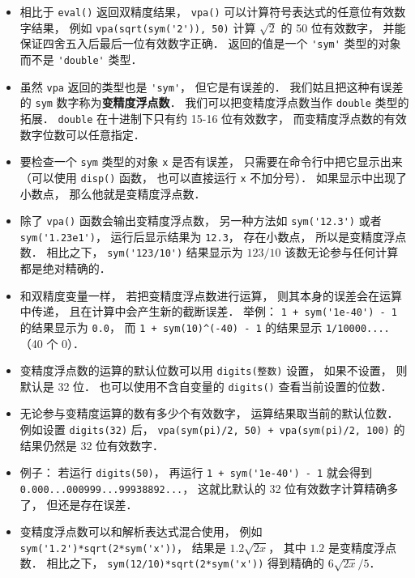 \begin{itemize}
\item 相比于 \verb|eval()| 返回双精度结果， \verb|vpa()| 可以计算符号表达式的任意位有效数字结果， 例如 \verb|vpa(sqrt(sym('2')), 50)| 计算 $\sqrt{2}$ 的 50 位有效数字， 并能保证四舍五入后最后一位有效数字正确． 返回的值是一个 \verb|'sym'| 类型的对象而不是 \verb|'double'| 类型．

\item 虽然 \verb|vpa| 返回的类型也是 \verb|'sym'|， 但它是有误差的． 我们姑且把这种有误差的 \verb|sym| 数字称为\textbf{变精度浮点数}． 我们可以把变精度浮点数当作 \verb|double| 类型的拓展． \verb|double| 在十进制下只有约 15-16 位有效数字， 而变精度浮点数的有效数字位数可以任意指定．

\item 要检查一个 \verb|sym| 类型的对象 \verb|x| 是否有误差， 只需要在命令行中把它显示出来（可以使用 \verb|disp()| 函数， 也可以直接运行 \verb|x| 不加分号）． 如果显示中出现了小数点， 那么他就是变精度浮点数．

\item 除了 \verb|vpa()| 函数会输出变精度浮点数， 另一种方法如 \verb|sym('12.3')| 或者 \verb|sym('1.23e1')|， 运行后显示结果为 \verb|12.3|， 存在小数点， 所以是变精度浮点数． 相比之下， \verb|sym('123/10')| 结果显示为 $123/10$ 该数无论参与任何计算都是绝对精确的．

\item 和双精度变量一样， 若把变精度浮点数进行运算， 则其本身的误差会在运算中传递， 且在计算中会产生新的截断误差． 举例： \verb|1 + sym('1e-40') - 1| 的结果显示为 \verb|0.0|， 而 \verb|1 + sym(10)^(-40) - 1| 的结果显示 \verb|1/10000....|（40 个 0）．

\item 变精度浮点数的运算的默认位数可以用 \verb|digits(整数)| 设置， 如果不设置， 则默认是 32 位． 也可以使用不含自变量的 \verb|digits()| 查看当前设置的位数．

\item 无论参与变精度运算的数有多少个有效数字， 运算结果取当前的默认位数． 例如设置 \verb|digits(32)| 后， \verb|vpa(sym(pi)/2, 50) + vpa(sym(pi)/2, 100)| 的结果仍然是 32 位有效数字．

\item 例子： 若运行 \verb|digits(50)|， 再运行 \verb|1 + sym('1e-40') - 1| 就会得到 \verb|0.000...000999...99938892...|， 这就比默认的 32 位有效数字计算精确多了， 但还是存在误差．

\item 变精度浮点数可以和解析表达式混合使用， 例如 \verb|sym('1.2')*sqrt(2*sym('x'))|， 结果是 $1.2 \sqrt{2x}$， 其中 $1.2$ 是变精度浮点数． 相比之下， \verb|sym(12/10)*sqrt(2*sym('x'))| 得到精确的 $6\sqrt{2x}/5$．
\end{itemize}

